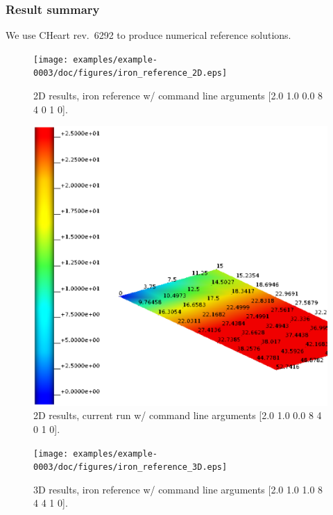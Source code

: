 \subsubsection{Result summary}
%
We use CHeart rev.\ 6292 to produce numerical reference solutions.
%


%
\begin{figure}[h!]
    \centering 
    \texttt{[image: examples/example-0003/doc/figures/iron\_reference\_2D.eps]} 
    \caption{2D results, iron reference w/ command line arguments [2.0 1.0 0.0 8 4 0 1 0].}
    \label{example-0003-iron-2D-reference-fig}
\end{figure}
%
\begin{figure}[h!]
    \centering 
    \includegraphics[width=0.9\columnwidth]{examples/example-0003/doc/figures/current_run_l2x1x0_n8x4x0_i1_s0.eps} 
    \caption{2D results, current run w/ command line arguments [2.0 1.0 0.0 8 4 0 1 0].}
    \label{example-0003-current-run-2D-fig}
\end{figure}
%
\begin{figure}[h!]
    \centering 
    \texttt{[image: examples/example-0003/doc/figures/iron\_reference\_3D.eps]} 
    \caption{3D results, iron reference w/ command line arguments [2.0 1.0 1.0 8 4 4 1 0].}
    \label{example-0003-iron-3D-reference-fig}
\end{figure}
%
